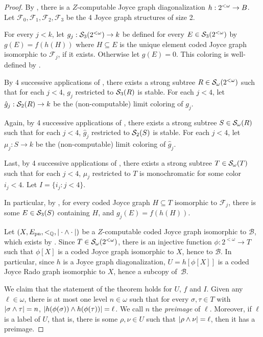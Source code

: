 \begin{proof}
By , there is a $Z$-computable Joyce graph diagonalization $h: {2^{<\omega}} \to B$.
Let $\mathcal{F}_0, \mathcal{F}_1, \mathcal{F}_2, \mathcal{F}_3$ be the 4 Joyce graph structures of size 2.

For every $j < k$, let $g_j: \mathcal{S}_{3}({2^{<\omega}}) \to k$ be defined for every $E \in \mathcal{S}_{3}({2^{<\omega}})$ by $g(E) = f(h(H))$ where $H \subseteq E$ is the unique element coded Joyce graph isomorphic to $\mathcal{F}_j$, if it exists. Otherwise let $g(E) = 0$. This coloring is well-defined by .


By 4 successive applications of , there exists a strong subtree $R \in \mathcal{S}_{\omega}({2^{<\omega}})$ such that for each $j < 4$, $g_j$ restricted to $\mathcal{S}_{3}({R})$ is stable. For each $j < 4$, let $\hat{g}_j: \mathcal{S}_{2}({R}) \to k$
 be the (non-computable) limit coloring of $g_j$. 
 
 Again, by 4 successive applications of , there exists a strong subtree $S \in \mathcal{S}_{\omega}({R})$ such that for each $j < 4$, $\hat{g}_j$ restricted to $\mathcal{S}_{2}({S})$ is stable. For each $j < 4$, let $\mu_j: S \to k$
 be the (non-computable) limit coloring of $\hat{g}_j$.
 
 Last, by 4 successive applications of ,
 there exists a strong subtree $T \in \mathcal{S}_{\omega}({T})$ such that for each $j < 4$,
 $\mu_j$ restricted to $T$ is monochromatic for some color $i_j < 4$. Let $I = \{i_j: j < 4\}$.


In particular, by , for every coded Joyce graph $H \subseteq T$ isomorphic to $\mathcal{F}_j$, there is some $E \in \mathcal{S}_{3}({S})$ containing $H$, and $g_j(E) = f(h(H))$.

Let $(X, E_{\mathrm{pn}}, <_{\mathbb{Q}}, |\cdot \wedge \cdot|)$ be a $Z$-computable coded Joyce graph isomorphic to $\mathcal{B}$, which exists by .
Since $T \in \mathcal{S}_{\omega}({2^{<\omega}})$, there is an injective function $\phi: 2^{<\omega} \to T$ such that $\phi[X]$ is a coded Joyce graph isomorphic to $X$, hence to $\mathcal{B}$. In particular, since $h$ is a Joyce graph diagonalization, $U = h[\phi[X]]$ is a coded Joyce Rado graph isomorphic to $X$, hence a subcopy of~$\mathcal{B}$.

We claim that the statement of the theorem holds for $U$, $f$ and $I$.
Given any $\ell \in \omega$, there is at most one level $n \in \omega$ such that for every $\sigma, \tau \in T$ with $|\sigma \wedge \tau| = n$, $|h(\phi(\sigma)) \wedge h(\phi(\tau))| = \ell$. We call $n$ the \emph{preimage} of $\ell$. Moreover, if $\ell$ is a label of $U$, that is, there is some $\rho, \nu \in U$ such that $|\rho \wedge \nu| = \ell$, then it has a preimage. 


\end{proof}
